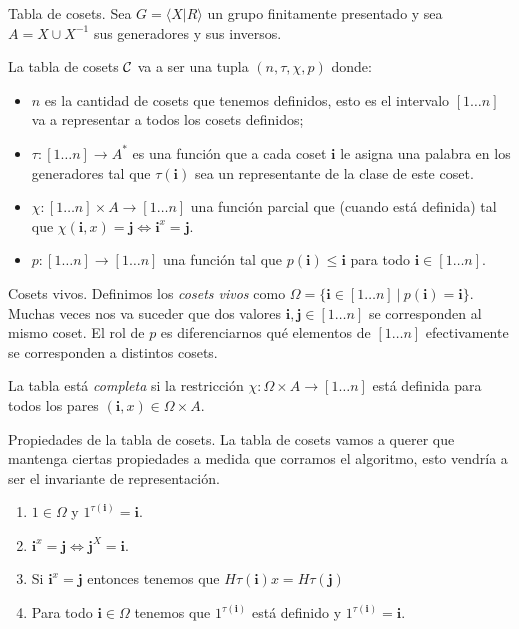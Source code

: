 \documentclass[aspectratio=169, 9pt]{beamer}
\newcommand{\fp}{finitamente presentado }
\newcommand{\In}{[1 \dots n]}
\newcommand{\Co}{{\cal{C}}}
\begin{document}
\begin{frame}[fragile]{Tabla de cosets.}
	Sea $G = \langle X | R \rangle$ un grupo \fp y sea $A = X \cup X^{-1}$ sus generadores y sus inversos.
	\pause
	
	La tabla de cosets $\Co $ va a ser una tupla $(n, \tau, \chi, p)$ donde:
	\pause
	\begin{itemize}
		\item $n$ es la cantidad de cosets que tenemos definidos, esto es el intervalo $\In$ va a representar a todos los cosets definidos;
		\pause
		\item $\tau : \In \to A^*$ es una función que a cada coset $\textbf{i}$ le asigna una palabra en los generadores tal que $\tau(\textbf{i})$ sea un representante de la clase de este coset.
		\pause
		\item $\chi: \In \times A \to \In$ una función parcial que (cuando está definida) tal que $\chi(\textbf{i}, x) = \textbf{j} \iff \textbf{i}^x = \textbf{j}$.
		\pause
		\item $p: [1 \dots n] \to [1 \dots n]$ una función tal que $p(\textbf{i}) \le \textbf{i}$ para todo $\textbf{i} \in [1\dots n]$.
	\end{itemize}
	
\end{frame}

\begin{frame}[fragile]{Cosets vivos.}
	Definimos los \emph{cosets vivos} como $\Omega = \{ \textbf{i} \in \In  \ | \ p(\textbf{i}) = \textbf{i} \}$.
	Muchas veces nos va suceder que dos valores $\textbf{i}, \textbf{j} \in \In$ se corresponden al mismo coset.
	El rol de $p$ es diferenciarnos qué elementos de $\In$ efectivamente se corresponden a distintos cosets.
	\pause
	\medskip
	
	
	
	La tabla está \emph{completa} si la restricción $\chi:\Omega \times A \to \In$ está definida para todos los pares $(\textbf{i}, x) \in \Omega \times A$. 
\end{frame}

\begin{frame}[fragile]{Propiedades de la tabla de cosets.}
	La tabla de cosets vamos a querer que mantenga ciertas propiedades a medida que corramos el algoritmo, esto vendría a ser el invariante de representación.
	\pause
	
	
	
	\begin{enumerate}
		\item $1 \in \Omega$ y $1^{\tau(\textbf{i})} = \textbf{i}$.
		\pause
		\item $\textbf{i}^x = \textbf{j} \iff \textbf{j}^{X} = \textbf{i}$.
		\pause
		\item Si $\textbf{i}^x = \textbf{j}$ entonces tenemos que $H \tau(\textbf{i}) x = H \tau(\textbf{j})$
		\pause
		\item Para todo $\textbf{i} \in \Omega$ tenemos que $1^{\tau(\textbf{i})}$ está definido y $1^{\tau(\textbf{i})} = \textbf{i}$.
	\end{enumerate}
\end{frame}
\end{document}
